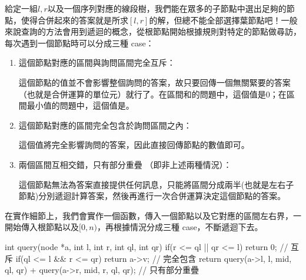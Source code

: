 \begin{center}

\end{center}

給定一組$l, r$以及一個序列對應的線段樹，我們能在眾多的子節點中選出足夠的節點，使得合併起來的答案就是所求$[l,r]$的解，但總不能全部選擇葉節點吧！一般來說查詢的方法會用到遞迴的概念，從根節點開始根據規則對特定的節點做尋訪，每次遇到一個節點時可以分成三種 case：

\begin{enumerate}
\item 這個節點對應的區間與詢問區間完全互斥：

這個節點的值並不會影響整個詢問的答案，故只要回傳一個無關緊要的答案（也就是合併運算的單位元）就行了。在區間和的問題中，這個值是0；在區間最小值的問題中，這個值是。

\item 這個節點對應的區間完全包含於詢問區間之內：

這個值將完全影響詢問的答案，因此直接回傳節點的數值即可。

\item 兩個區間互相交錯，只有部分重疊 （即非上述兩種情況）：

這個節點無法為答案直接提供任何訊息，只能將區間分成兩半(也就是左右子節點)分別遞迴計算答案，然後再進行一次合併運算決定這個節點的答案。
\end{enumerate}

在實作細節上，我們會實作一個函數，傳入一個節點以及它對應的區間左右界，一開始傳入根節點以及$[0, n)$，再根據情況分成三種 case，不斷遞迴下去。 \\

\begin{C++}
int query(node *a, int l, int r, int ql, int qr){
	  if(r <= ql || qr <= l) return 0; // 互斥
	  if(ql <= l && r <= qr) return a->v; // 完全包含
	  return query(a->l, l, mid, ql, qr) + 
    		   query(a->r, mid, r, ql, qr); // 只有部分重疊
}
\end{C++}

